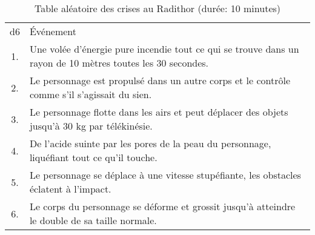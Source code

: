 \begin{table}
	\caption{Table aléatoire des crises au Radithor (durée: 10 minutes)}
	\label{table:radithor}
	\begin{tabularx}{0.9\textwidth}{cX}
	d6 & Événement\\
	1. & Une volée d'énergie pure incendie tout ce qui se trouve dans un rayon de 10 mètres toutes les 30 secondes.\\
	2. & Le personnage est propulsé dans un autre corps et le contrôle comme s'il s'agissait du sien.\\
	3. & Le personnage flotte dans les airs et peut déplacer des objets jusqu'à 30 kg par télékinésie.\\
	4. & De l'acide suinte par les pores de la peau du personnage, liquéfiant tout ce qu'il touche.\\
	5. & Le personnage se déplace à une vitesse stupéfiante, les obstacles éclatent à l'impact.\\
	6. & Le corps du personnage se déforme et grossit jusqu'à atteindre le double de sa taille normale.\\
	\end{tabularx}
\end{table}

\vfill
{}
\vfill
